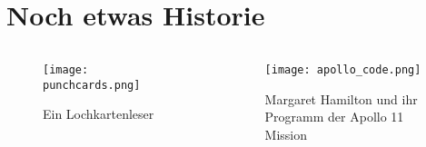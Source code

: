\maketitle

\section{Noch etwas Historie}
\begin{frame}[c]
    \slidehead
    \begin{columns}[T]
        \begin{column}{.3\textwidth}
            \begin{figure}
                \centering
                \texttt{[image: punchcards.png]}
                \caption*{Ein Lochkartenleser}
            \end{figure}
        \end{column}%
        \begin{column}{.4\textwidth}
            \centering
            \begin{figure}
                \centering
                \texttt{[image: apollo\_code.png]}
                \caption*{\footnotesize Margaret Hamilton und ihr \\ Programm der Apollo 11 Mission}
            \end{figure}
        \end{column}
    \end{columns}
\end{frame}

